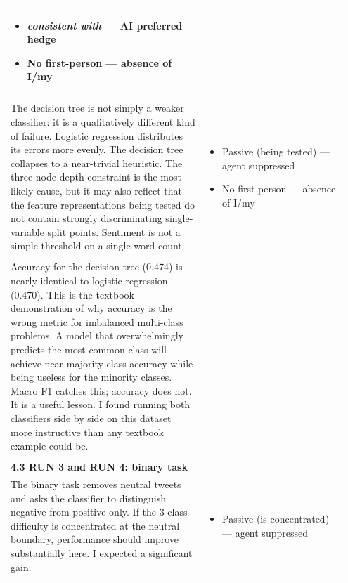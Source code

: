 \documentclass[11pt]{article}
\begin{document}
\begin{longtable}{|p{0.55\linewidth}|p{0.40\linewidth}|}
\begin{itemize}[leftmargin=1em,itemsep=1pt,topsep=1pt,parsep=0pt]
  \item \textit{consistent with} --- AI preferred hedge
  \item No first-person --- absence of I/my
\end{itemize} \\[2pt]
\hline
\rule[-3.5cm]{0pt}{3.5cm} & \\
\hline
The decision tree is not simply a weaker classifier: it is a qualitatively different kind of failure. Logistic regression distributes its errors more evenly. The decision tree collapses to a near-trivial heuristic. The three-node depth constraint is the most likely cause, but it may also reflect that the feature representations being tested do not contain strongly discriminating single-variable split points. Sentiment is not a simple threshold on a single word count. & \begin{itemize}[leftmargin=1em,itemsep=1pt,topsep=1pt,parsep=0pt]
  \item Passive (being tested) --- agent suppressed
  \item No first-person --- absence of I/my
\end{itemize} \\[2pt]
\hline
\rule[-3.5cm]{0pt}{3.5cm} & \\
\hline
Accuracy for the decision tree (0.474) is nearly identical to logistic regression (0.470). This is the textbook demonstration of why accuracy is the wrong metric for imbalanced multi-class problems. A model that overwhelmingly predicts the most common class will achieve near-majority-class accuracy while being useless for the minority classes. Macro F1 catches this; accuracy does not. It is a useful lesson. I found running both classifiers side by side on this dataset more instructive than any textbook example could be. &  \\[2pt]
\hline
\rule[-3.5cm]{0pt}{3.5cm} & \\
\hline
\textbf{4.3 RUN 3 and RUN 4: binary task}\\[4pt]
The binary task removes neutral tweets and asks the classifier to distinguish negative from positive only. If the 3-class difficulty is concentrated at the neutral boundary, performance should improve substantially here. I expected a significant gain. & \begin{itemize}[leftmargin=1em,itemsep=1pt,topsep=1pt,parsep=0pt]
  \item Passive (is concentrated) --- agent suppressed
\end{itemize} \\[2pt]

\end{longtable}
\end{document}

